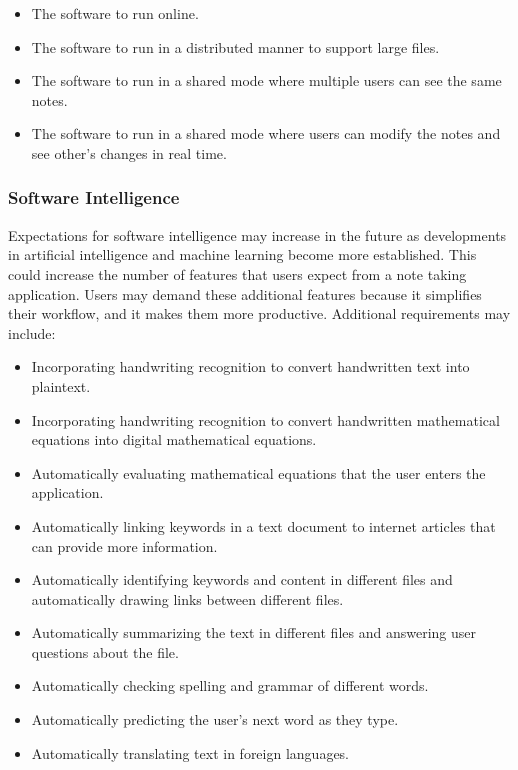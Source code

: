 \documentclass{article}
\begin{document}
\begin{itemize}
\item The software to run online.
\item The software to run in a distributed manner to support large files.
\item The software to run in a shared mode where multiple users can see the same notes.
\item The software to run in a shared mode where users can modify the notes and see other's changes in real time.
\end{itemize}

\subsubsection{Software Intelligence}
Expectations for software intelligence may increase in the future as developments in artificial intelligence and machine learning become more established. This could increase the number of features that users expect from a note taking application. Users may demand these additional features because it simplifies their workflow, and it makes them more productive. Additional requirements may include:

\begin{itemize}
\item Incorporating handwriting recognition to convert handwritten text into plaintext.
\item Incorporating handwriting recognition to convert handwritten mathematical equations into digital mathematical equations.
\item Automatically evaluating mathematical equations that the user enters the application.
\item Automatically linking keywords in a text document to internet articles that can provide more information.
\item Automatically identifying keywords and content in different files and automatically drawing links between different files.
\item Automatically summarizing the text in different files and answering user questions about the file.
\item Automatically checking spelling and grammar of different words.
\item Automatically predicting the user's next word as they type.
\item Automatically translating text in foreign languages.
\end{itemize}
\end{document}
